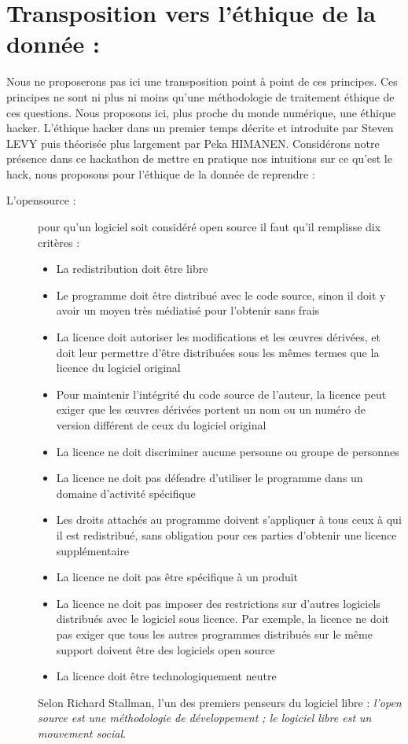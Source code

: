 \documentclass[a4paper,12pt]{article}
\begin{document}
\section{Transposition vers l'éthique de la donnée : }
Nous ne proposerons pas ici une transposition point à point de ces principes. Ces principes ne sont ni plus ni moins qu'une méthodologie de traitement éthique de ces questions. 
Nous proposons ici, plus proche du monde numérique, une éthique hacker. L'éthique hacker dans un premier temps décrite et introduite par Steven LEVY puis théorisée plus largement par Peka HIMANEN. Considérons notre présence dans ce hackathon de mettre en pratique nos intuitions sur ce qu'est le hack, nous proposons pour l'éthique de la donnée de reprendre :
	\begin{description}
		\item [L'opensource : ] pour qu'un logiciel soit considéré open source il faut qu'il remplisse dix critères :
		\begin{itemize}
			\item  La redistribution doit être libre
			\item Le programme doit être distribué avec le code source, sinon il doit y avoir un moyen très médiatisé pour l’obtenir sans frais
			\item La licence doit autoriser les modifications et les œuvres dérivées, et doit leur permettre d'être distribuées sous les mêmes termes que la licence du logiciel original
			\item Pour maintenir l’intégrité du code source de l'auteur, la licence peut exiger que les œuvres dérivées portent un nom ou un numéro de version différent de ceux du logiciel original
			\item La licence ne doit discriminer aucune personne ou groupe de personnes
			\item La licence ne doit pas défendre d'utiliser le programme dans un domaine d'activité spécifique
			\item Les droits attachés au programme doivent s'appliquer à tous ceux à qui il est redistribué, sans obligation pour ces parties d'obtenir une licence supplémentaire
			\item La licence ne doit pas être spécifique à un produit
			\item La licence ne doit pas imposer des restrictions sur d'autres logiciels distribués avec le logiciel sous licence. Par exemple, la licence ne doit pas exiger que tous les autres programmes distribués sur le même support doivent être des logiciels open source 
			\item La licence doit être technologiquement neutre
		\end{itemize}	
Selon Richard Stallman, l'un des premiers penseurs du logiciel libre : \textit{l'open source est une méthodologie de développement ; le logiciel libre est un mouvement social}. 


\end{description}
\end{document}
